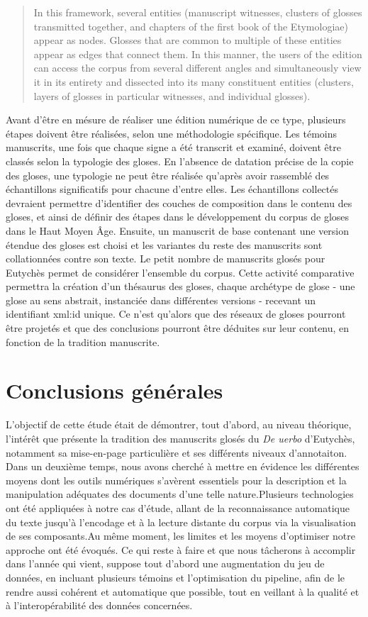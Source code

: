 \documentclass[a4paper, twoside, 12pt]{book}
\begin{document}
\blockquote{In this framework, several entities (manuscript witnesses, clusters of glosses transmitted together, and chapters of the first book of the Etymologiae) appear as nodes. Glosses that are common to multiple of these entities appear as edges that connect them. In this manner, the users of the edition can access the corpus from several different angles and simultaneously view it in its entirety and dissected into its many constituent entities (clusters, layers of glosses in particular witnesses, and individual glosses).}

Avant d'être en mésure de réaliser une édition numérique de ce type, plusieurs étapes doivent être réalisées, selon une méthodologie spécifique. Les témoins manuscrits, une fois que chaque signe a été transcrit et examiné, doivent être classés selon la typologie des gloses. En l'absence de datation précise de la copie des gloses, une typologie ne peut être réalisée qu'après avoir rassemblé des échantillons significatifs pour chacune d'entre elles. Les échantillons collectés devraient permettre d'identifier des couches de composition dans le contenu des gloses, et ainsi de définir des étapes dans le développement du corpus de gloses dans le Haut Moyen Âge. Ensuite, un manuscrit de base contenant une version étendue des gloses est choisi et les variantes du reste des manuscrits sont collationnées contre son texte. Le petit nombre de manuscrits glosés pour Eutychès permet de considérer l'ensemble du corpus.  Cette activité comparative permettra la création d'un thésaurus des gloses, chaque \og{}archétype\fg{} de glose - une glose au sens abstrait, instanciée dans différentes versions - recevant un identifiant xml:id unique. Ce n'est qu'alors que des réseaux de gloses pourront être projetés et que des conclusions pourront être déduites sur leur contenu, en fonction de la tradition manuscrite. 


\section{Conclusions générales}

L'objectif de cette étude était de démontrer, tout d'abord, au niveau théorique, l'intérêt que présente la tradition des manuscrits glosés du \textit{De uerbo} d'Eutychès, notamment sa mise-en-page particulière et ses différents niveaux d'annotaiton. Dans un deuxième temps, nous avons cherché à mettre en évidence les différentes moyens dont les outils numériques s'avèrent essentiels pour la description et la manipulation adéquates des documents d'une telle nature.Plusieurs technologies ont été appliquées à notre cas d'étude, allant de la reconnaissance automatique du texte jusqu'à l'encodage et à la lecture distante du corpus via la visualisation de ses composants.Au même moment, les limites et les moyens d'optimiser notre approche ont été évoqués. Ce qui reste à faire et que nous tâcherons à accomplir dans l'année qui vient, suppose tout d'abord une augmentation du jeu de données, en incluant plusieurs témoins et l'optimisation du pipeline, afin de le rendre aussi cohérent et automatique que possible, tout en veillant à la qualité et à l'interopérabilité des données concernées.


\newpage
\nocite{*}
\printbibliography

\listoffigures
\end{document}
